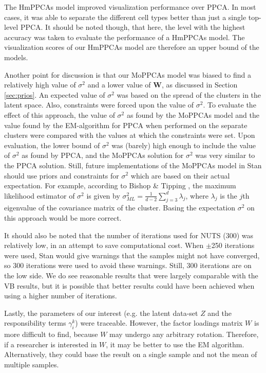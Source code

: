 
The HmPPCAs model improved visualization performance over PPCA. In most cases, it was able to separate the different cell types better than just a single top-level PPCA.
It should be noted though, that here, the level with the highest accuracy was taken to evaluate the performance of a HmPPCAs model. The visualization scores of our HmPPCAs model are therefore an upper bound of the models.


Another point for discussion is that our MoPPCAs model was biased to find a relatively high value of $\sigma^2$ and a lower value of $\bm{W}$, as discussed in Section \ref{sec:prios}. An expected value of $\sigma^2$ was based on the spread of the clusters in the latent space. Also, constraints were forced upon the value of $\sigma^2$. To evaluate the effect of this approach, the value of $\sigma^2$ as found by the MoPPCAs model and the value found by the EM-algorithm for PPCA when performed on the separate clusters were compared with the values at which the constraints were set. Upon evaluation, the lower bound of $\sigma^2$ was (barely) high enough to include the value of $\sigma^2$ as found by PPCA, and the MoPPCAs solution for $\sigma^2$ was very similar to the PPCA solution. Still, future implementations of the MoPPCAs model in Stan should use priors and constraints for $\sigma^2$ which are based on their actual expectation. For example, according to Bishop \& Tipping \cite{bishop1998hierarchical}, the maximum likelihood estimator of $\sigma^2$ is given by $\sigma^2_{ML} = \frac{1}{d-2}\sum_{j=3}^d \lambda_j$, where $\lambda_j$ is the $j$th eigenvalue of the covariance matrix of the cluster. Basing the expectation $\sigma^2$ on this approach would be more correct.

It should also be noted that the number of iterations used for NUTS (300) was relatively low, in an attempt to save computational cost. When $\pm$250 iterations were used, Stan would give warnings that the samples might not have converged, so 300 iterations were used to avoid these warnings. Still, 300 iterations are on the low side. We do see reasonable results that were largely comparable with the VB results, but it is possible that better results could have been achieved when using a higher number of iterations.

Lastly, the parameters of our interest (e.g. the latent data-set $Z$ and the responsibility terms $\gamma_i^k$) were traceable. However, the factor loadings matrix $W$ is more difficult to find, because $W$ may undergo any arbitrary rotation. Therefore, if a researcher is interested in $W$, it may be better to use the EM algorithm. Alternatively, they could base the result on a single sample and not the mean of multiple samples.

